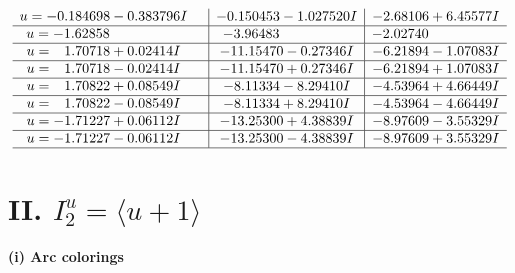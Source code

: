 \documentclass[1p]{elsarticle_modified}
\theoremstyle{definition}
\begin{document}
$$\begin{array}{c|c|c}
\begin{aligned}
u &= -0.184698 - 0.383796 I\end{aligned}
 & -0.150453 - 1.027520 I & -2.68106 + 6.45577 I \\ \hline\begin{aligned}
u &= -1.62858\phantom{ +0.000000I}\end{aligned}
 & -3.96483\phantom{ +0.000000I} & -2.02740\phantom{ +0.000000I} \\ \hline\begin{aligned}
u &= \phantom{-}1.70718 + 0.02414 I\end{aligned}
 & -11.15470 - 0.27346 I & -6.21894 - 1.07083 I \\ \hline\begin{aligned}
u &= \phantom{-}1.70718 - 0.02414 I\end{aligned}
 & -11.15470 + 0.27346 I & -6.21894 + 1.07083 I \\ \hline\begin{aligned}
u &= \phantom{-}1.70822 + 0.08549 I\end{aligned}
 & -8.11334 - 8.29410 I & -4.53964 + 4.66449 I \\ \hline\begin{aligned}
u &= \phantom{-}1.70822 - 0.08549 I\end{aligned}
 & -8.11334 + 8.29410 I & -4.53964 - 4.66449 I \\ \hline\begin{aligned}
u &= -1.71227 + 0.06112 I\end{aligned}
 & -13.25300 + 4.38839 I & -8.97609 - 3.55329 I \\ \hline\begin{aligned}
u &= -1.71227 - 0.06112 I\end{aligned}
 & -13.25300 - 4.38839 I & -8.97609 + 3.55329 I\\
 \hline 
 \end{array}$$\newpage\newpage\renewcommand{\arraystretch}{1}
\centering \section*{II. $I^u_{2}= \langle u+1 \rangle$}
\flushleft \textbf{(i) Arc colorings}\\
\end{document}
